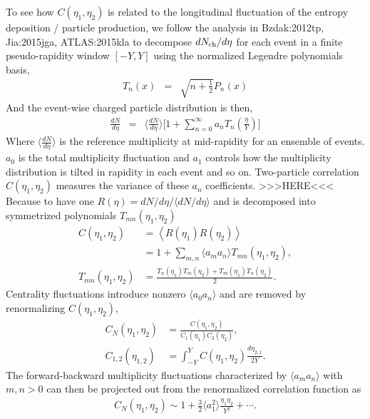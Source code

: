 To see how $C(\eta_1, \eta_2)$ is related to the longitudinal fluctuation of the entropy deposition / particle production, we follow the analysis in  {Bzdak:2012tp, Jia:2015jga, ATLAS:2015kla} to decompose $dN_\text{ch}/d\eta$ for each event in a finite pseudo-rapidity window $[-Y, Y]$ using the normalized Legendre polynomials basis,
\begin{eqnarray}
T_n(x) &=& \sqrt{n + \frac{1}{2}} P_n(x)
\end{eqnarray}
And the event-wise charged particle distribution is then,
\begin{eqnarray}
\frac{dN}{d\eta} &=& \biggl\langle\frac{dN}{d\eta}\biggr\rangle \biggl[1 + \sum_{n=0}^\infty a_n T_n\left(\frac{\eta}{Y}\right) \biggr]
\end{eqnarray}
Where $\biggl\langle\frac{dN}{d\eta}\biggr\rangle$ is the reference multiplicity at mid-rapidity for an ensemble of events.
$a_0$ is the total multiplicity fluctuation and $a_1$ controls how the multiplicity distribution is tilted in rapidity in each event and so on.
Two-particle correlation $C(\eta_1, \eta_2)$ measures the variance of these $a_n$ coefficients.
>>>HERE<<< Because to have one  $R(\eta) = dN/d\eta /\langle dN/d\eta\rangle$ and is decomposed into symmetrized polynomials $T_{mn}(\eta_1, \eta_2)$
\begin{align}
  C(\eta_1, \eta_2) &= \left\langle R(\eta_1) R(\eta_2)\right\rangle \\
  &= 1 + \sum_{m, n}\langle a_m a_n\rangle  T_{mn}(\eta_1, \eta_2),  \\
  T_{mn}(\eta_1, \eta_2) &= \frac{T_n(\eta_1)T_m(\eta_2) + T_m(\eta_1)T_n(\eta_2)}{2}.
\end{align}
Centrality fluctuations introduce nonzero $\langle a_0 a_n\rangle$ and are removed by renormalizing $C(\eta_1, \eta_2)$,
\begin{align}
  C_N(\eta_1, \eta_2) &= \frac{C(\eta_1, \eta_2)}{C_1(\eta_1)C_2(\eta_2)},\\[.5ex]
  C_{1,2}(\eta_{1,2}) &= \int_{-Y}^{Y}C(\eta_1, \eta_2)\frac{d\eta_{2,1}}{2Y}.
\end{align}
The forward-backward multiplicity fluctuations characterized by $\langle a_m a_n\rangle$ with $m, n > 0$ can then be projected out from the renormalized correlation function as
\begin{align}
  C_N(\eta_1, \eta_2) \sim 1 + \frac{3}{2}\langle a_1 ^2 \rangle \frac{\eta_1\eta_2}{Y^2} + \cdots.
\end{align}

